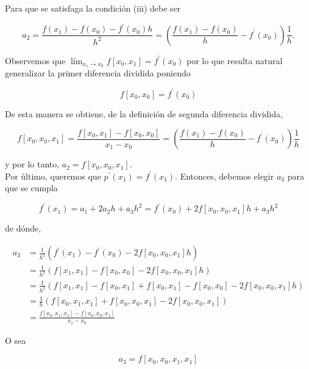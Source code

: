 \documentclass[10pt]{book}
\begin{document}
Para que se satisfaga la condición (iii) debe ser

$$
a_{2}=\frac{f\left(x_{1}\right)-f\left(x_{0}\right)-f^{\prime}\left(x_{0}\right) h}{h^{2}}=\left(\frac{f\left(x_{1}\right)-f\left(x_{0}\right)}{h}-f^{\prime}\left(x_{0}\right)\right) \frac{1}{h} .
$$

Observemos que $\operatorname{lím}_{x_{1} \rightarrow x_{0}} f\left[x_{0}, x_{1}\right]=f^{\prime}\left(x_{0}\right)$ por lo que resulta natural generalizar la primer diferencia dividida poniendo

$$
f\left[x_{0}, x_{0}\right]=f^{\prime}\left(x_{0}\right)
$$

De esta manera se obtiene, de la definición de segunda diferencia dividida,

$$
f\left[x_{0}, x_{0}, x_{1}\right]=\frac{f\left[x_{0}, x_{1}\right]-f\left[x_{0}, x_{0}\right]}{x_{1}-x_{0}}=\left(\frac{f\left(x_{1}\right)-f\left(x_{0}\right)}{h}-f^{\prime}\left(x_{0}\right)\right) \frac{1}{h}
$$

y por lo tanto, $a_{2}=f\left[x_{0}, x_{0}, x_{1}\right]$.\\
Por último, queremos que $p^{\prime}\left(x_{1}\right)=f^{\prime}\left(x_{1}\right)$. Entonces, debemos elegir $a_{3}$ para que se cumpla

$$
f^{\prime}\left(x_{1}\right)=a_{1}+2 a_{2} h+a_{3} h^{2}=f^{\prime}\left(x_{0}\right)+2 f\left[x_{0}, x_{0}, x_{1}\right] h+a_{3} h^{2}
$$

de dónde,

$$
\begin{aligned}
a_{3} & =\frac{1}{h^{2}}\left(f^{\prime}\left(x_{1}\right)-f^{\prime}\left(x_{0}\right)-2 f\left[x_{0}, x_{0}, x_{1}\right] h\right) \\
& =\frac{1}{h^{2}}\left(f\left[x_{1}, x_{1}\right]-f\left[x_{0}, x_{0}\right]-2 f\left[x_{0}, x_{0}, x_{1}\right] h\right) \\
& =\frac{1}{h^{2}}\left(f\left[x_{1}, x_{1}\right]-f\left[x_{0}, x_{1}\right]+f\left[x_{0}, x_{1}\right]-f\left[x_{0}, x_{0}\right]-2 f\left[x_{0}, x_{0}, x_{1}\right] h\right) \\
& =\frac{1}{h}\left(f\left[x_{0}, x_{1}, x_{1}\right]+f\left[x_{0}, x_{0}, x_{1}\right]-2 f\left[x_{0}, x_{0}, x_{1}\right]\right) \\
& =\frac{f\left[x_{0}, x_{1}, x_{1}\right]-f\left[x_{0}, x_{0}, x_{1}\right]}{x_{1}-x_{0}}
\end{aligned}
$$

O sea

$$
a_{3}=f\left[x_{0}, x_{0}, x_{1}, x_{1}\right]
$$
\end{document}
